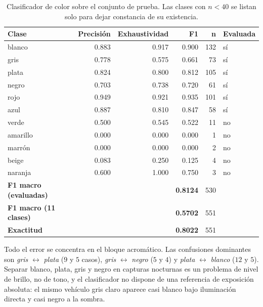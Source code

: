 \begin{table}[H]
    \centering
    \caption{Clasificador de color sobre el conjunto de prueba. Las clases con
    $n < 40$ se listan solo para dejar constancia de su existencia.}
    \begin{tabular}{lrrrrl}
        \toprule
        \textbf{Clase} & \textbf{Precisión} & \textbf{Exhaustividad} & \textbf{F1} & \textbf{n} & \textbf{Evaluada} \\
        \midrule
        blanco    & 0.883 & 0.917 & 0.900 & 132 & sí \\
        gris      & 0.778 & 0.575 & 0.661 &  73 & sí \\
        plata     & 0.824 & 0.800 & 0.812 & 105 & sí \\
        negro     & 0.703 & 0.738 & 0.720 &  61 & sí \\
        rojo      & 0.949 & 0.921 & 0.935 & 101 & sí \\
        azul      & 0.887 & 0.810 & 0.847 &  58 & sí \\
        \midrule
        verde     & 0.500 & 0.545 & 0.522 &  11 & no \\
        amarillo  & 0.000 & 0.000 & 0.000 &   1 & no \\
        marrón    & 0.000 & 0.000 & 0.000 &   2 & no \\
        beige     & 0.083 & 0.250 & 0.125 &   4 & no \\
        naranja   & 0.600 & 1.000 & 0.750 &   3 & no \\
        \midrule
        \textbf{F1 macro (evaluadas)} & \multicolumn{2}{c}{} & \textbf{0.8124} & 530 & \\
        \textbf{F1 macro (11 clases)} & \multicolumn{2}{c}{} & \textbf{0.5702} & 551 & \\
        \textbf{Exactitud} & \multicolumn{2}{c}{} & \textbf{0.8022} & 551 & \\
        \bottomrule
    \end{tabular}
\end{table}

Todo el error se concentra en el bloque acromático. Las confusiones dominantes son
\textit{gris} $\leftrightarrow$ \textit{plata} ($9$ y $5$ casos),
\textit{gris} $\leftrightarrow$ \textit{negro} ($5$ y $4$) y
\textit{plata} $\leftrightarrow$ \textit{blanco} ($12$ y $5$). Separar blanco,
plata, gris y negro en capturas nocturnas es un problema de nivel de brillo, no de
tono, y el clasificador no dispone de una referencia de exposición absoluta: el
mismo vehículo gris claro aparece casi blanco bajo iluminación directa y casi
negro a la sombra.

